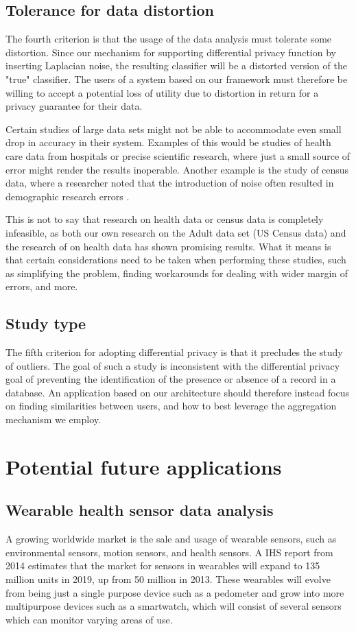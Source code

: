 \subsection{Tolerance for data distortion}
The fourth criterion is that the usage of the data analysis must tolerate some distortion. Since our mechanism for supporting differential privacy function by inserting Laplacian noise, the resulting classifier will be a distorted version of the "true" classifier. The users of a system based on our framework must therefore be willing to accept a potential loss of utility due to distortion in return for a privacy guarantee for their data. 

Certain studies of large data sets might not be able to accommodate even small drop in accuracy in their system. Examples of this would be studies of health care data from hospitals or precise scientific research, where just a small source of error might render the results inoperable. Another example is the study of census data, where a researcher noted that the introduction of noise often resulted in demographic research errors \citep{yakowitz2011tragedy}. 

This is not to say that research on health data or census data is completely infeasible, as both our own research on the Adult data set (US Census data) and the research of \cite{ji2014DisLogReg} on health data has shown promising results. What it means is that certain considerations need to be taken when performing these studies, such as simplifying the problem, finding workarounds for dealing with wider margin of errors, and more. 

\subsection{Study type}
The fifth criterion for adopting differential privacy is that it precludes the study of outliers. The goal of such a study is inconsistent with the differential privacy goal of preventing the identification of the presence or absence of a record in a database. An application based on our architecture should therefore instead focus on finding similarities between users, and how to best leverage the aggregation mechanism we employ. 


\section{Potential future applications}
\subsection{Wearable health sensor data analysis }
A growing worldwide market is the sale and usage of wearable sensors, such as environmental sensors, motion sensors, and health sensors. A IHS report \citep{ihs2014reportwearables} from 2014 estimates that the market for sensors in wearables will expand to 135 million units in 2019, up from 50 million in 2013. These wearables will evolve from being just a single purpose device such as a pedometer and grow into more multipurpose devices such as a smartwatch, which will consist of several sensors which can monitor varying areas of use. 

